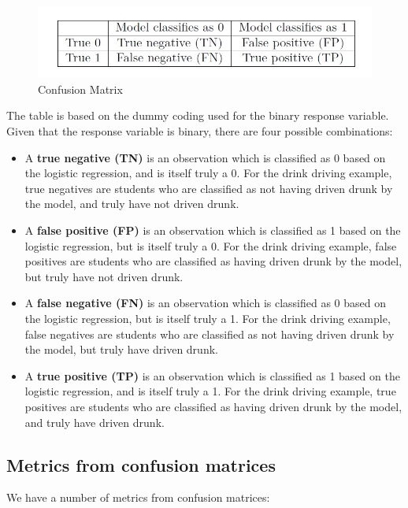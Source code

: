 \documentclass[
]{book}
\begin{document}
\begin{figure}
\centering
\includegraphics{images/12conf.jpg}
\caption{\label{fig:12conf}Confusion Matrix}
\end{figure}

The table is based on the dummy coding used for the binary response variable. Given that the response variable is binary, there are four possible combinations:

\begin{itemize}
\item
  A \textbf{true negative (TN)} is an observation which is classified as 0 based on the logistic regression, and is itself truly a 0. For the drink driving example, true negatives are students who are classified as not having driven drunk by the model, and truly have not driven drunk.
\item
  A \textbf{false positive (FP)} is an observation which is classified as 1 based on the logistic regression, but is itself truly a 0. For the drink driving example, false positives are students who are classified as having driven drunk by the model, but truly have not driven drunk.
\item
  A \textbf{false negative (FN)} is an observation which is classified as 0 based on the logistic regression, but is itself truly a 1. For the drink driving example, false negatives are students who are classified as not having driven drunk by the model, but truly have driven drunk.
\item
  A \textbf{true positive (TP)} is an observation which is classified as 1 based on the logistic regression, and is itself truly a 1. For the drink driving example, true positives are students who are classified as having driven drunk by the model, and truly have driven drunk.
\end{itemize}

\hypertarget{metrics-from-confusion-matrices}{%
\subsection{Metrics from confusion matrices}\label{metrics-from-confusion-matrices}}

We have a number of metrics from confusion matrices:
\end{document}
